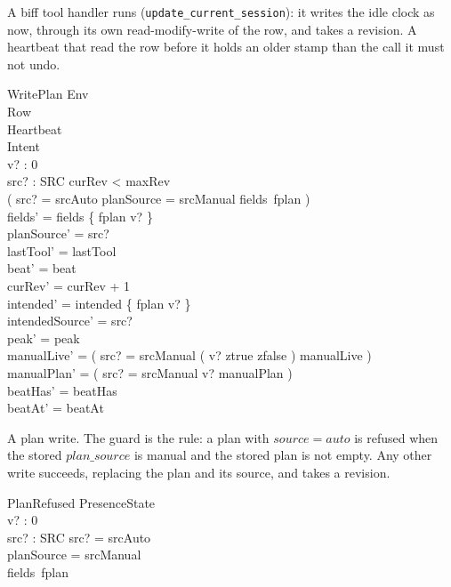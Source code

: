 \documentclass[a4paper,10pt,fleqn]{article}
\begin{document}
A biff tool handler runs (\texttt{update\_current\_session}): it writes the idle
clock as now, through its own read-modify-write of the row, and takes a
revision.  A heartbeat that read the row before it holds an older stamp than
the call it must not undo.

\begin{schema}{WritePlan}
  \Xi Env \\
  \Delta Row \\
  \Xi Heartbeat \\
  \Delta Intent \\
  v? : 0  \\
  src? : SRC
  \where
  curRev < maxRev \\
  \lnot ( src? = srcAuto \land planSource = srcManual \land fields~fplan  ) \\
  fields' = fields \oplus \{ fplan \mapsto v? \} \\
  planSource' = src? \\
  lastTool' = lastTool \\
  beat' = beat \\
  curRev' = curRev + 1 \\
  intended' = intended \oplus \{ fplan \mapsto v? \} \\
  intendedSource' = src? \\
  peak' = peak \\
  manualLive' = ( \IF src? = srcManual \THEN
    ( \IF v?  \THEN ztrue \ELSE zfalse ) \ELSE manualLive ) \\
  manualPlan' = ( \IF src? = srcManual \THEN v? \ELSE manualPlan ) \\
  beatHas' = beatHas \\
  beatAt' = beatAt
\end{schema}

A plan write.  The guard is the rule: a plan with $source = auto$ is refused
when the stored $plan\_source$ is manual and the stored plan is not empty.  Any
other write succeeds, replacing the plan and its source, and takes a revision.

\begin{schema}{PlanRefused}
  \Xi PresenceState \\
  v? : 0  \\
  src? : SRC
  \where
  src? = srcAuto \\
  planSource = srcManual \\
  fields~fplan 
\end{schema}
\end{document}
